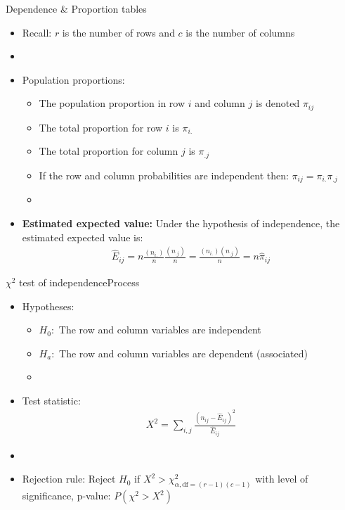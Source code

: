 \documentclass[xcolor=dvipsnames]{beamer}
\begin{document}
\begin{frame}{Dependence \& Proportion tables}
\begin{itemize}
	\item Recall: $r$ is the number of rows and $c$ is the number of columns
	\item[]
	\item Population proportions:
	\begin{itemize}
		\item The population proportion in row $i$ and column $j$ is denoted $\pi_{ij}$
		\item The total proportion for row $i$ is $\pi_{i.}$
		\item The total proportion for column $j$ is $\pi_{.j}$
		\item If the row and column probabilities are independent then: $\pi_{ij}=\pi_{i.}\pi_{.j}$
		\item[]
	\end{itemize}
	\item \textbf{Estimated expected value:} Under the hypothesis of independence, the estimated expected value is:  \pause
	\begin{gather*}
		\hat{E}_{ij} =n\frac{(n_{i.})}{n} \frac{(n_{.j})}{n} =  \frac{(n_{i.})(n_{.j})}{n} = n \hat{\pi}_{ij}
	\end{gather*}
\end{itemize}
\end{frame}

\begin{frame}{$\chi^2$ test of independence}{Process}
	\begin{itemize}
		\item Hypotheses:  \pause
		\begin{itemize}
			\item $H_0:$ The row and column variables are independent  \pause
			\item $H_a:$ The row and column variables are dependent (associated)  \pause
			\item[]
		\end{itemize}
	\item Test statistic:
	\begin{gather*}
		X^2 = \sum_{i,j} \frac{(n_{ij}-\hat{E}_{ij})^2}{\hat{E}_{ij}}
	\end{gather*}  \pause
	\item[]
	\item Rejection rule: Reject $H_0$ if $X^2 > \chi^2_{\alpha,\text{df}=(r-1)(c-1)}$ with level of significance, p-value: $P(\chi^2 > X^2)$
	\end{itemize}
\end{frame}
\end{document}
